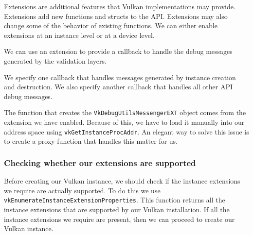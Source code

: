 Extensions are  additional features that Vulkan implementations may provide.
Extensions add new functions and structs to the API.
Extensions may also change some of the behavior of existing functions.
We can either enable extensions at an instance level or at a device level.

We can use an extension to provide a callback to handle the debug messages
generated by the validation layers.

\begin{minipage}{\linewidth}{\noindent}
    
\end{minipage}

We specify one callback that handles messages generated by
instance creation and destruction.
We also specify another callback that handles all other API debug messages.

\begin{minipage}{\linewidth}{\noindent}
    
\end{minipage}

The function that creates the \texttt{VkDebugUtilsMessengerEXT} object comes from the
extension we have enabled.
Because of this, we have to load it manually into our address space using
\texttt{vkGetInstanceProcAddr}.
An elegant way to solve this issue is to create a proxy function that handles
this matter for us.

\begin{minipage}{\linewidth}{\noindent}
    
\end{minipage}

\subsubsection{Checking whether our extensions are supported}

Before creating our Vulkan instance, we should check if the instance extensions
we require are actually supported.
To do this we use \texttt{vkEnumerateInstanceExtensionProperties}.
This function returns all the instance extensions that are supported by our
Vulkan installation.
If all the instance extensions we require are present, then we can proceed to
create our Vulkan instance.

